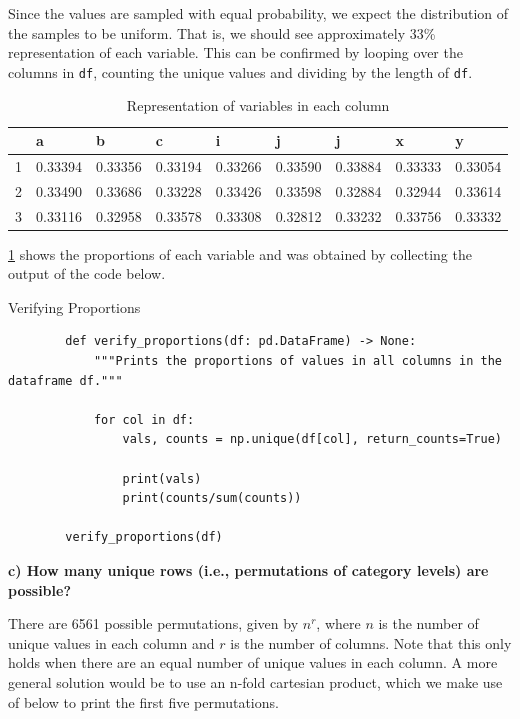 \documentclass{article}
\begin{document}
    
Since the values are sampled with equal probability, we expect the distribution of the samples to be uniform. That is, we should see approximately 33\% representation of each variable. This can be confirmed by looping over the columns in \texttt{df}, counting the unique values and dividing by the length of \texttt{df}.

\begin{table}[H]
    \caption{Representation of variables in each column}
    \label{tbl:props}
    \vspace{0.5\baselineskip}
    \begin{tabular}{l|llllllll}
        & a       & b       & c       & i       & j       & j       & x       & y       \\ \midrule
        1 & 0.33394 & 0.33356 & 0.33194 & 0.33266 & 0.33590 & 0.33884 & 0.33333 & 0.33054 \\
        2 & 0.33490 & 0.33686 & 0.33228 & 0.33426 & 0.33598 & 0.32884 & 0.32944 & 0.33614 \\
        3 & 0.33116 & 0.32958 & 0.33578 & 0.33308 & 0.32812 & 0.33232 & 0.33756 & 0.33332
    \end{tabular}
\end{table}

\cref{tbl:props} shows the proportions of each variable and was obtained by collecting the output of the code below.

\begin{mybox}[colbacktitle=green]{Verifying Proportions}
    \begin{verbatim}
        def verify_proportions(df: pd.DataFrame) -> None:
            """Prints the proportions of values in all columns in the dataframe df."""

            for col in df:
                vals, counts = np.unique(df[col], return_counts=True)

                print(vals)
                print(counts/sum(counts))

        verify_proportions(df)
    \end{verbatim}
\end{mybox}





\textbf{c) How many unique rows (i.e., permutations of category levels) are possible?}

\vspace{\baselineskip}

There are 6561 possible permutations, given by $n^r$, where $n$ is the number of unique values in each column and $r$ is the number of columns. Note that this only holds when there are an equal number of unique values in each column. A more general solution would be to use an n-fold cartesian product, which we make use of below to print the first five permutations. 
\end{document}
